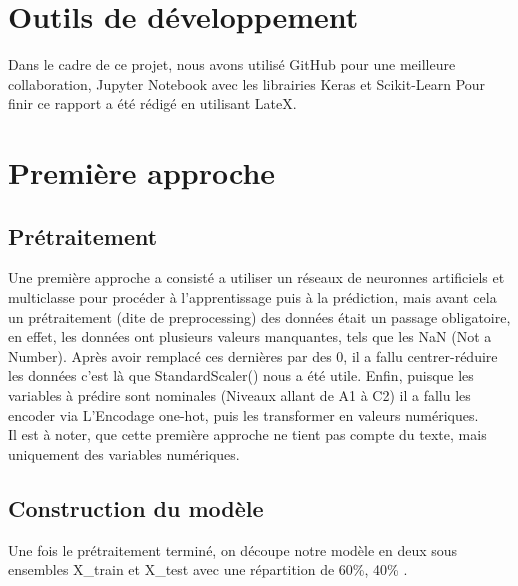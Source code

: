 \documentclass[11pt]{article}
\begin{document}
\section{Outils de développement}

Dans le cadre de ce projet, nous avons utilisé GitHub pour une meilleure collaboration, Jupyter Notebook avec les librairies Keras et Scikit-Learn \newline Pour finir ce rapport a été rédigé en utilisant LateX.

\section{Première approche}

\subsection{Prétraitement}

Une première approche a consisté a utiliser un réseaux de neuronnes artificiels et multiclasse pour procéder à l'apprentissage puis à la prédiction, mais avant cela un prétraitement  (dite de preprocessing) des données était un passage obligatoire, en effet, les données ont plusieurs valeurs manquantes, tels que les NaN (Not a Number). \newline
Après avoir remplacé ces dernières par des 0, il a fallu centrer-réduire les données c'est là que StandardScaler() nous a été utile.  \newline
Enfin, puisque les variables à prédire sont nominales (Niveaux allant de A1 à C2) il a fallu les encoder via L'Encodage one-hot, puis les transformer en valeurs numériques.\\
Il est à noter, que cette première approche ne tient pas compte du texte, mais uniquement des variables numériques.

\subsection{Construction du modèle}

Une fois le prétraitement terminé, on découpe notre modèle en deux sous ensembles X\_train et X\_test avec une répartition de 60\%, 40\% . \newline
\end{document}
